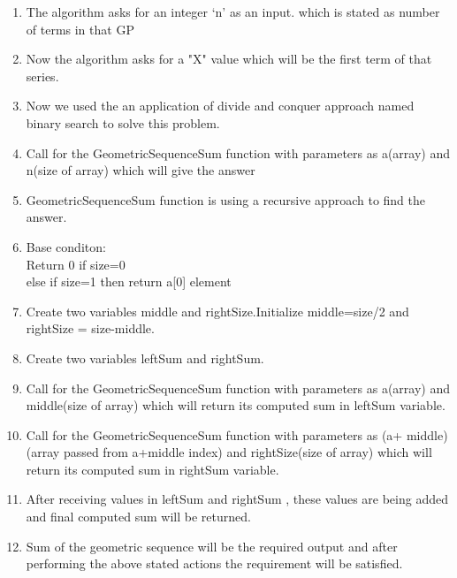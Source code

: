 \documentclass[conference]{IEEEtran}
\begin{document}
\begin{enumerate}

\item The algorithm asks for an integer ‘n’ as an input. which is stated as number of terms in that GP\\

\item Now the algorithm asks for a "X" value which will be the first term of that series.\\

\item Now we used the an application of divide and conquer approach named binary search to solve this problem.
\\
\item Call for the GeometricSequenceSum function with parameters as a(array) and n(size of array) which will give the answer \\
\item GeometricSequenceSum function is using a recursive approach to ﬁnd the answer.\\
\item Base conditon:\\
Return 0 if size=0\\
else if size=1 then return a[0] element\\
\item Create two variables middle and rightSize.Initialize middle=size/2 and rightSize = size-middle.\\
\item Create two variables leftSum and rightSum.\\
\item Call for the GeometricSequenceSum function with parameters as a(array) and middle(size of array) which will return its computed sum in leftSum variable.\\
\item Call for the GeometricSequenceSum function with parameters as (a+ middle)(array passed from a+middle index) and rightSize(size of array) which will return its computed sum in rightSum variable.\\
\item After receiving values in leftSum and rightSum , these values are being added and final computed sum will be returned.\\
\item  Sum of the geometric sequence will be the required output and after  performing the above stated actions the requirement will be satisfied.\\





\end{enumerate}
\end{document}
